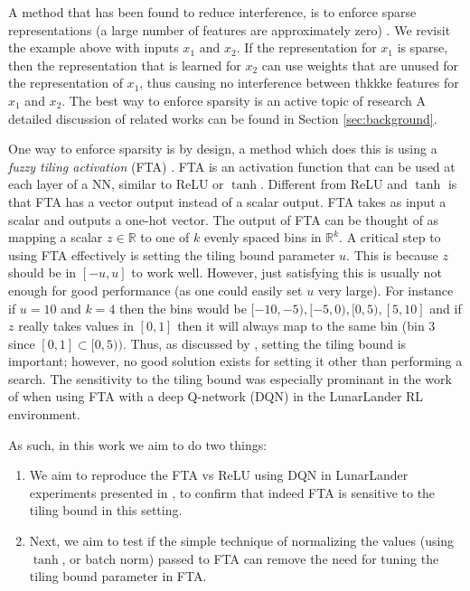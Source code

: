 \documentclass{article}
\newcommand{\RR}{\mathbb{R}}
\begin{document}
A method that has been found to reduce interference, is to enforce sparse representations (a large number of features are approximately zero) \cite[]{liu2019,javed2019,rafati2019learning}.
We revisit the example above with inputs $x_1$ and $x_2$.
If the representation for $x_1$ is sparse, then the representation that is learned for $x_2$ can use weights that are unused for the representation of $x_1$, 
thus causing no interference between thkkke features for $x_1$ and $x_2$.
The best way to enforce sparsity is an active topic of research
A detailed discussion of related works can be found in Section \ref{sec:background}.

One way to enforce sparsity is by design, a method which does this is using a \textit{fuzzy tiling activation} (FTA) \cite[]{pan2019fuzzy}.
FTA is an activation function that can be used at each layer of a NN, similar to ReLU or $\tanh$.
Different from ReLU and $\tanh$ is that FTA has a vector output instead of a scalar output.
FTA takes as input a scalar and outputs a one-hot vector.
The output of FTA can be thought of as mapping a scalar $z \in \RR$ to one of $k$ evenly spaced bins in $\RR^k$.
A critical step to using FTA effectively is setting the tiling bound parameter $u$.
This is because $z$ should be in $[-u, u]$ to work well. 
However, just satisfying this is usually not enough for good performance (as one could easily set $u$ very large).
For instance if $u = 10$ and $k = 4$ then the bins would be $[-10, -5), [-5, 0), [0, 5), [5, 10]$ 
and if $z$ really takes values in $[0,1]$ then it will always map to the same bin (bin $3$ since $[0, 1] \subset [0, 5))$.
Thus, as discussed by \cite[]{pan2019fuzzy}, setting the tiling bound is important; however, no good solution exists for setting it other than performing a search.
The sensitivity to the tiling bound was especially prominant in the work of \cite[]{pan2019fuzzy} when using FTA with a deep Q-network (DQN) \cite[]{mnih2013playing} in the LunarLander RL environment.

As such, in this work we aim to do two things:
\begin{enumerate}
  \item We aim to reproduce the FTA vs ReLU using DQN in LunarLander experiments presented in \cite[]{pan2019fuzzy}, to confirm that indeed FTA is sensitive to the tiling bound in this setting.
  \item Next, we aim to test if the simple technique of normalizing the values (using $\tanh$, or batch norm) passed to FTA can remove the need for tuning the tiling bound parameter in FTA.
\end{enumerate}
\end{document}
